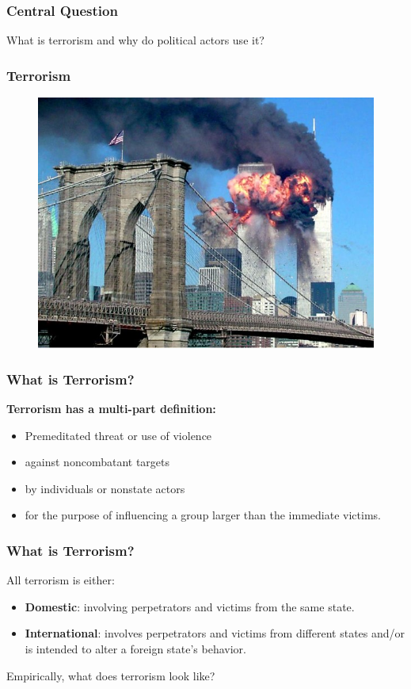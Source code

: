 \documentclass[handout]{beamer}
\begin{document}
\begin{frame} 
	\frametitle{\LARGE{Central Question}}
    \centering
    \Large{What is terrorism and why do political actors use it?} 
\end{frame}


\begin{frame} 
	\frametitle{\LARGE{Terrorism}}
	\begin{figure}[ht!]
		\centering
		\includegraphics[width=\textwidth,height=.9\textheight,keepaspectratio]{911.jpg}
	\end{figure}
\end{frame}

\begin{frame} 
\frametitle{\LARGE{What is Terrorism?}}
\textbf{Terrorism has a multi-part definition:}
\begin{itemize}
		\item Premeditated threat or use of violence \pause
		\item against noncombatant targets \pause
		\item by individuals or nonstate actors \pause
		\item for the purpose of influencing a group larger than the immediate victims.
\end{itemize}
\end{frame}

\begin{frame} 
	\frametitle{\LARGE{What is Terrorism?}}
All terrorism is either:
	\begin{itemize}
		\item \textbf{Domestic}: involving perpetrators and victims from the same state. \pause
		\item \textbf{International}: involves perpetrators and victims from different states and/or is intended to alter a foreign state's behavior. \pause
	\end{itemize}
Empirically, what does terrorism look like?
\end{frame}
\end{document}

